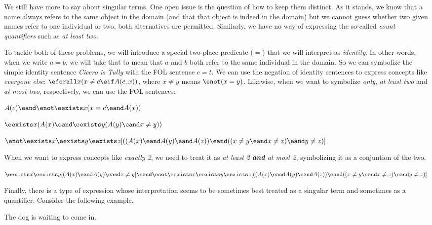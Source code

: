 We still have more to say about singular terms. One open issue is the question
of how to keep them distinct. As it stands, we know that a name always refers
to the same object in the domain (and that that object is indeed in the domain)
but we cannot guess whether two given names refer to one individual or two, both
alternatives are permitted. Similarly, we have no way of expressing the
so-called \emph{count quantifiers} such as \emph{at least two}.

To tackle both of these problems, we will introduce a special two-place
predicate ($=$) that we will interpret as \emph{identity}. In other words,
when we write $a=b$, we will take that to mean that $a$ and $b$ both refer to
the same individual in the domain. So we can symbolize the simple identity
sentence \emph{Cicero is Tully} with the FOL sentence $c=t$. We can use the
negation of identity sentences to express concepts like \emph{everyone else}: 
$\eforall x(x\neq c\eif A(c,x))$, where $x\neq y$ means $\enot(x=y)$. Likewise,
when we want to symbolize \emph{only}, \emph{at least two} and
\emph{at most two}, respectively, we can use the FOL sentences:

\begin{argument}
\item[ ] $A(c)\eand\enot\eexists x(x=c\eand A(x))$
\item[ ] $\eexists x(A(x)\eand \eexists y(A(y)\eand x\neq y))$
\item[ ] $\enot\eexists x\eexists y\eexists z[((A(x)\eand A(y)\eand A(z))\eand((x\neq y\eand x\neq z)\eand y\neq z)]$
\end{argument}

When we want to express concepts like \emph{exactly 2}, we need to treat it
as \emph{at least 2 \textbf{and} at most 2}, symbolizing it as a conjuntion of
the two.

\begin{argument}
\item[ ] $\eexists x\eexists y[(A(x)\eand A(y)\eand x\neq y]\eand\enot\eexists x\eexists y\eexists z[((A(x)\eand A(y)\eand A(z))\eand((x\neq y\eand x\neq z)\eand y\neq z)]$
\end{argument}

Finally, there is a type of expression whose interpretation seems to be
sometimes best treated as a singular term and sometimes as a quantifier.
Consider the following example.

\begin{argument}
\item[ ] The dog is waiting to come in.
\end{argument}

